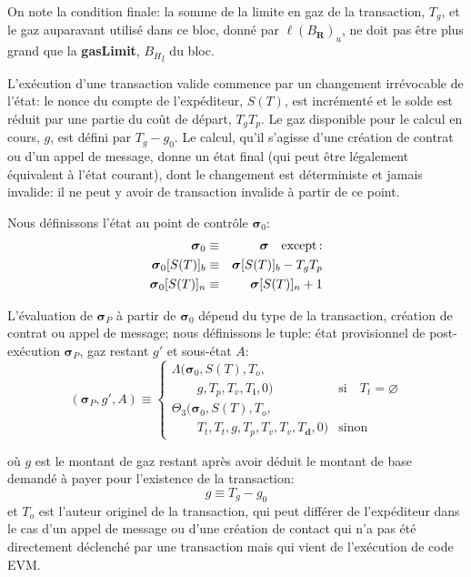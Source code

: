 \documentclass[9pt,oneside]{amsart}
\begin{document}
\begin{multicols}{2}
On note la condition finale: la somme de la limite en gaz de la transaction, $T_g$, et le gaz auparavant utilisé dans ce bloc, donné par $\ell(B_\mathbf{R})_u$, ne doit pas être plus grand que la \textbf{gasLimit}, ${B_H}_l$ du bloc.

L'exécution d'une transaction valide commence par un changement irrévocable de l'état: le nonce du compte de l'expéditeur, $S(T)$, est incrémenté et le solde est réduit par une partie du coût de départ, $T_gT_p$. Le gaz disponible pour le calcul en cours, $g$, est défini par $T_g - g_0$. Le calcul, qu'il s'agisse d'une création de contrat ou d'un appel de message, donne un état final (qui peut être légalement équivalent à l'état courant), dont le changement est déterministe et jamais invalide: il ne peut y avoir de transaction invalide à partir de ce point.

Nous définissons l'état au point de contrôle $\boldsymbol{\sigma}_0$:
\begin{eqnarray}
\boldsymbol{\sigma}_0 & \equiv & \boldsymbol{\sigma} \quad \text{except\,:} \\
\boldsymbol{\sigma}_0[S(T)]_b & \equiv & \boldsymbol{\sigma}[S(T)]_b - T_g T_p \\
\boldsymbol{\sigma}_0[S(T)]_n & \equiv & \boldsymbol{\sigma}[S(T)]_n + 1
\end{eqnarray}

L'évaluation de $\boldsymbol{\sigma}_P$ à partir de $\boldsymbol{\sigma}_0$ dépend du type de la transaction, création de contrat ou appel de message; nous définissons le tuple: état provisionnel de post-exécution $\boldsymbol{\sigma}_P$, gaz restant $g'$ et sous-état $A$:
\begin{equation}
(\boldsymbol{\sigma}_P, g', A) \equiv \begin{cases}
\Lambda(\boldsymbol{\sigma}_0, S(T), T_o, &\\ \quad\quad g, T_p, T_v, T_\mathbf{i}, 0) & \text{si} \quad T_t = \varnothing \\
\Theta_{3}(\boldsymbol{\sigma}_0, S(T), T_o, &\\ \quad\quad T_t, T_t, g, T_p, T_v, T_v, T_\mathbf{d}, 0) & \text{sinon}
\end{cases}
\end{equation}

où $g$ est le montant de gaz restant après avoir déduit le montant de base demandé à payer pour l'existence de la transaction:
\begin{equation}
g \equiv T_g - g_0
\end{equation}
et $T_o$ est l'auteur originel de la transaction, qui peut différer de l'expéditeur dans le cas d'un appel de message ou d'une création de contact qui n'a pas été directement déclenché par une transaction mais qui vient de l'exécution de code EVM.


\end{multicols}
\end{document}
